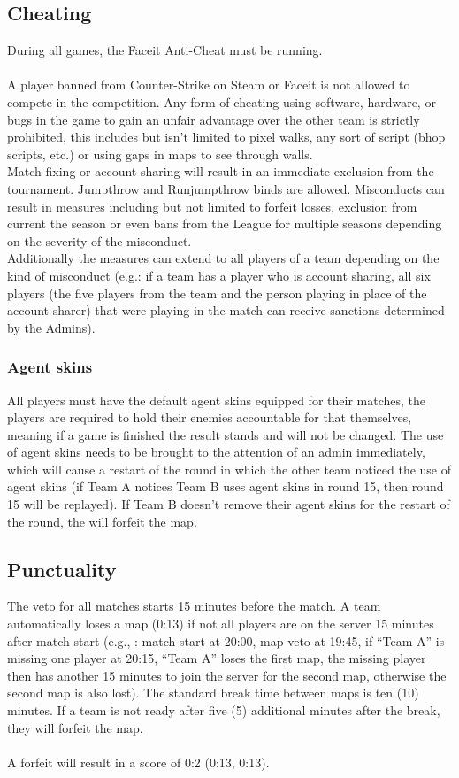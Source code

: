 \documentclass{article}
\newcommand{\TeamA}{{\color{red}Team A }}
\newcommand{\TeamB}{{\color{blue}Team B }}
\begin{document}
\subsection{Cheating}\label{cheating}
During all games, the Faceit Anti-Cheat must be running.\\
\\
A player banned from Counter-Strike on Steam or Faceit is not allowed to compete in the competition.
Any form of cheating using software, hardware, or bugs in the game to gain an unfair advantage over the 
other team is strictly prohibited, this includes but isn't limited to pixel walks, any sort of script (bhop scripts, etc.) or
using gaps in maps to see through walls. \\
Match fixing or account sharing will result in an immediate exclusion from the tournament.
Jumpthrow and Runjumpthrow binds are allowed. Misconducts can result in measures including but not limited to forfeit losses, exclusion from current the season or even bans from the League for multiple seasons depending on the severity of the misconduct. \\

\noindent
Additionally the measures can extend to all players of a team depending on the kind of misconduct (e.g.: if a team has a player 
who is account sharing, all six players (the five players from the team and the person playing in place of the account sharer)  
that were playing in the match can receive sanctions determined by the Admins).


\subsubsection{Agent skins}\label{agents}
All players must have the default agent skins equipped for their matches, the players are required to hold their enemies accountable for that themselves, meaning if a game is finished the result stands and will not be changed. The use of agent skins needs to be brought to 
the attention of an admin immediately, which will cause a restart of the round in which the other team noticed the use of agent skins (if \TeamA notices \TeamB uses agent skins in round 15, then round 15 will be replayed). If \TeamB doesn't remove their agent skins for the restart of the round, the will forfeit the map.   


\subsection{Punctuality}\label{punc}
The veto for all matches starts 15 minutes before the match. A team automatically loses a map (0:13) if not all players are on the server 15 minutes after match start (e.g., : match start at 20:00, map veto at 19:45, if “Team A” is missing one player at 20:15, “Team A” loses the first map, the missing player then has another 15 minutes to join the server for the second map, otherwise the second map is also lost). The standard break time between maps is ten (10) minutes. If a team is not ready after five (5) additional minutes after the break, they will forfeit the map. \\
\\
A forfeit will result in a score of 0:2 (0:13, 0:13).
\end{document}
